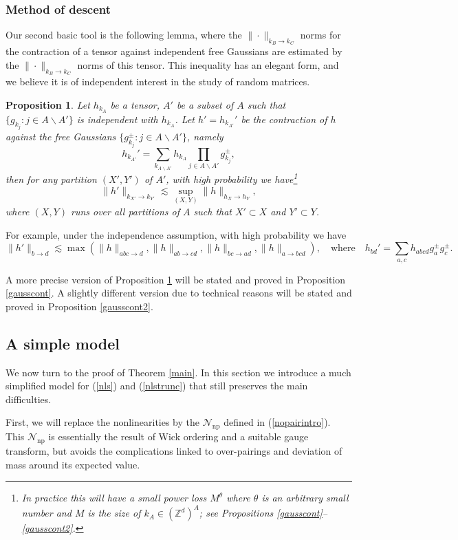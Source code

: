 \documentclass[11 pt,reqno]{amsart}
\newtheorem{prop}[thm]{Proposition}
\theoremstyle{definition}
\theoremstyle{remark}
\numberwithin{equation}{section}
\newcommand{\Nc}{\mathcal{N}}
\newcommand{\Zb}{\mathbb{Z}}
\begin{document}
\subsubsection{Method of descent} Our second basic tool is the following lemma, where the $\|\cdot\|_{k_B\to k_C}$ norms for the contraction of a tensor against independent free Gaussians are estimated by the $\|\cdot\|_{k_B\to k_C}$ norms of this tensor. This inequality has an elegant form, and we believe it is of independent interest in the study of random matrices.
\begin{prop}\label{gausscont0} Let $h_{k_A}$ be a tensor, $A'$ be a subset of $A$ such that $\{g_{k_j}:j\in A\backslash A'\}$ is independent with $h_{k_A}$. Let $h'=h_{k_{A'}}'$ be the contraction of $h$ against the free Gaussians $\{g_{k_j}^\pm:j\in A\backslash A'\}$, namely
\[h_{k_{A'}}'=\sum_{k_{A\backslash A'}}h_{k_A}\prod_{j\in A\backslash A'}g_{k_j}^\pm,\] then for any partition $(X',Y')$ of $A'$, with high probability we have\footnote{In practice this will have a small power loss $M^\theta$ where $\theta$ is an arbitrary small number and $M$ is the size of $k_A\in(\Zb^d)^A$; see Propositions \ref{gausscont}--\ref{gausscont2}.}
\[\|h'\|_{k_{X'}\to k_{Y'}}\lesssim\sup_{(X,Y)}\|h\|_{h_X\to h_Y},\]where $(X,Y)$ runs over all partitions of $A$ such that $X'\subset X$ and $Y'\subset Y$.
\end{prop} For example, under the independence assumption, with high probability we have
\[\|h'\|_{b\to d}\lesssim\max(\|h\|_{abc\to d},\|h\|_{ab\to cd},\|h\|_{bc\to ad},\|h\|_{a\to bcd}),\quad \mathrm{where}\quad h_{bd}'=\sum_{a,c}h_{abcd}g_a^\pm g_c^\pm.\]

A more precise version of Proposition \ref{gausscont0} will be stated and proved in Proposition \ref{gausscont}. A slightly different version due to technical reasons will be stated and proved in Proposition \ref{gausscont2}.
 \subsection{A simple model}\label{simmodel} We now turn to the proof of Theorem \ref{main}. In this section we introduce a much simplified model for (\ref{nls}) and (\ref{nlstrunc}) that still preserves the main difficulties.
 
 First, we will replace the nonlinearities by the $\Nc_{\mathrm{np}}$ defined in (\ref{nopairintro}). This $\Nc_{\mathrm{np}}$ is essentially the result of Wick ordering and a suitable gauge transform, but avoids the complications linked to over-pairings and deviation of mass around its expected value.
 
\end{document}
